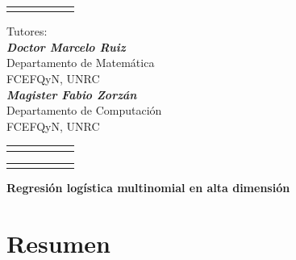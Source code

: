 \documentclass{report}
\begin{document}
		\begin{center}
			\vspace{1.5cm}
			\begin{tabular}{cccccc}
				\hline 
				\hspace{10cm}
			\end{tabular}
			
			\vspace{1.5cm}
			
			Tutores:\\
			\medskip
			{\it \textbf{Doctor Marcelo Ruiz}} \\
			
			Departamento de Matemática\\ FCEFQyN, UNRC \\
			
			
			
			
			
			{\it \textbf{ Magister Fabio Zorzán }} \\
			Departamento de Computación\\ FCEFQyN, UNRC \\
			
			\medskip
			
			\medskip
			
			
			
			
			
			\vspace{8cm}
			
			\begin{tabular}{cccccc}
				\hline 
				\hspace{10cm}
			\end{tabular}
			\begin{tabular}{cccccc}
				\hline 
				\hspace{10cm}
			\end{tabular}
			
			
		\end{center}
		
		\newpage
		
		\newpage
		
		
		\begin{center}
			{\large\textbf{Regresión logística multinomial en alta dimensión}}
		\end{center}
		
		\vspace{2 cm}
		\noindent 
		\section*{Resumen} 		
		
\end{document}
